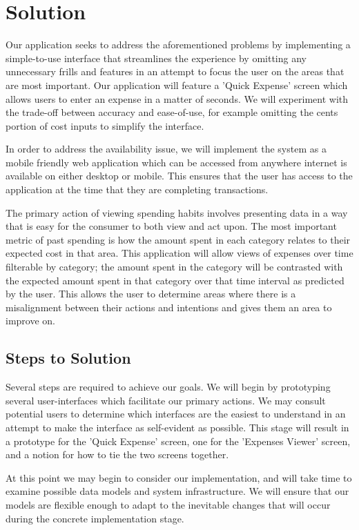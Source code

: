 \documentclass{chi2011}
\begin{document}
\section{Solution}

Our application seeks to address the aforementioned problems by implementing a simple-to-use interface that streamlines
the experience by omitting any unnecessary frills and features in an attempt to focus the user on the areas that are
most important. Our application will feature a 'Quick Expense' screen which allows users to enter an expense in a
matter of seconds. We will experiment with the trade-off between accuracy and ease-of-use, for example omitting the
cents portion of cost inputs to simplify the interface.

In order to address the availability issue, we will implement the system as a mobile friendly web application which can
be accessed from anywhere internet is available on either desktop or mobile. This ensures that the user has access to
the application at the time that they are completing transactions.

The primary action of viewing spending habits involves presenting data in a way that is easy for the consumer to both
view and act upon. The most important metric of past spending is how the amount spent in each category relates to their
expected cost in that area. This application will allow views of expenses over time filterable by category; the amount
spent in the category will be contrasted with the expected amount spent in that category over that time interval as
predicted by the user. This allows the user to determine areas where there is a misalignment between their actions and
intentions and gives them an area to improve on.

\subsection{Steps to Solution}

Several steps are required to achieve our goals. We will begin by prototyping several user-interfaces which facilitate
our primary actions. We may consult potential users to determine which interfaces are the easiest to understand in an
attempt to make the interface as self-evident as possible. This stage will result in a prototype for the 'Quick
Expense' screen, one for the 'Expenses Viewer' screen, and a notion for how to tie the two screens together.

At this point we may begin to consider our implementation, and will take time to examine possible data models and
system infrastructure. We will ensure that our models are flexible enough to adapt to the inevitable changes that will
occur during the concrete implementation stage.
\end{document}
